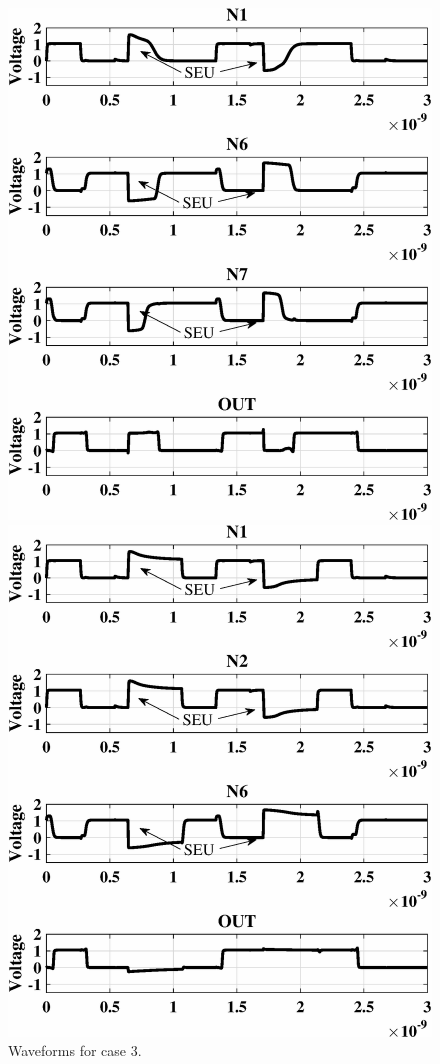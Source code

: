 \begin{figure}[!htbp]
	\centering
	\parbox{4cm}{
		\includegraphics[width=\linewidth]{Figures/TNUPlots/case3.eps}
		\caption{Waveforms for case 3.}
		\label{fig:case3}}
	\qquad
	\begin{minipage}{4cm}
		\includegraphics[width=\linewidth]{Figures/TNUPlots/case4.eps}

\end{minipage}
\end{figure}
